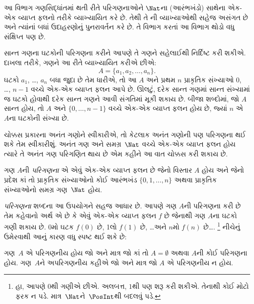 \begingroup
\makeatletter{}\makeatother


\label{guunit:OLP-0038}


\begin{editorial}
  આ વિભાગ ગણસિદ્ધાંતમાં થતી રીતે પરિગણનાઓને $\Nat$ના
  (આરંભખંડો) સાથેના એક-એક વ્યાપ્ત ફલનો તરીકે વ્યાખ્યાયિત કરે છે.
  તેથી તે ની વ્યાખ્યાઓથી સહેજ અસંગત છે અને ત્યાંનાં
  બધાં ઉદાહરણોનું પુનરાવર્તન કરે છે. તે વિભાગ કરતાં આ વિભાગ થોડો
  વધુ સંક્ષિપ્ત પણ છે.
\end{editorial}

સાન્ત ગણના ઘટકોની પરિગણના કરીને આપણે તે ગણને સહેલાઈથી
નિર્દિષ્ટ કરી શકીએ. દાખલા તરીકે, ગણને આ રીતે વ્યાખ્યાયિત કરીએ છીએ:
\[
  A = \{a_1, a_2, \ldots, a_n\}.
\]
ઘટકો $a_1$, \dots, $a_n$ બધા જુદા છે તેમ ધારીએ, તો આ
$A$ અને પ્રથમ $n$ પ્રાકૃતિક સંખ્યાઓ $0$, \dots, $n-1$ વચ્ચે
એક-એક વ્યાપ્ત ફલન આપે છે. ઊલટું, દરેક સાન્ત ગણમાં સાન્ત સંખ્યામાં જ
ઘટકો હોવાથી દરેક સાન્ત ગણને આવી સંગતિમાં મૂકી શકાય છે.
બીજા શબ્દોમાં, જો $A$ સાન્ત હોય, તો $A$ અને $\{0, \dots, n-1\}$
વચ્ચે એક-એક વ્યાપ્ત ફલન હોય છે, જ્યાં $n$ એ $A$ના ઘટકોની સંખ્યા છે.

ચોક્કસ પ્રકારના અનંત ગણોને સ્વીકારીએ, તો કેટલાક અનંત ગણોની પણ
પરિગણના થઈ શકે તેમ સ્વીકારીશું. અનંત ગણ અને સમગ્ર~$\Nat$ વચ્ચે
એક-એક વ્યાપ્ત ફલન હોય ત્યારે તે અનંત ગણ પરિગણિત થાય છે એમ કહીને આ
વાત ચોક્કસ કરી શકાય છે.

\begin{defn}
ગણ $A$ની \emph{પરિગણના} એ એવું એક-એક વ્યાપ્ત ફલન છે જેનો વિસ્તાર
$A$ હોય અને જેનો પ્રદેશ કાં તો પ્રાકૃતિક સંખ્યાઓનો કોઈ આરંભખંડ
$\{0, 1, \ldots, n\}$ {અથવા} પ્રાકૃતિક સંખ્યાઓનો સમગ્ર ગણ~$\Nat$ હોય.
\end{defn}

\begin{explain}
\emph{પરિગણના} શબ્દના આ ઉપયોગને સહજ આધાર છે. આપણે ગણ $A$ની
પરિગણના કરી છે તેમ કહેવાનો અર્થ એ છે કે એવું એક-એક વ્યાપ્ત ફલન $f$
છે જેનાથી ગણ $A$ના ઘટકો ગણી શકાય છે. $0$મો ઘટક $f(0)$ છે,
1લો $f(1)$ છે, \ldots અને $n$મો $f(n)$ છે\ldots.
\footnote{હા, આપણે $0$થી ગણીએ છીએ. અલબત્ત, $1$થી પણ શરૂ કરી
શકીએ. તેનાથી કોઈ મોટો ફરક ન પડે. માત્ર~$\Nat$ને~$\PosInt$થી
બદલવું પડે.} નીચેનું ઉમેરવાથી આનું કારણ વધુ સ્પષ્ટ થઈ શકે છે:
\end{explain}

\begin{defn}
  ગણ~$A$ એ પરિગણનીય હોય જો અને માત્ર જો કાં તો
  $A = \emptyset$ અથવા $A$ની કોઈ પરિગણના હોય. ગણ~$A$ને
  અપરિગણનીય કહીએ જો અને માત્ર જો $A$ એ પરિગણનીય ન હોય.
\end{defn}

